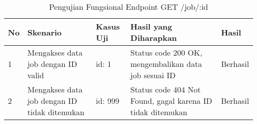 \begin{table}[H]
    \centering
    \begin{tabular}{|p{0.5cm}|p{3cm}|p{5cm}|p{5cm}|p{1.5cm}|}
        \hline
        \rowcolor[HTML]{DAE8FC} 
        \textbf{No} & \textbf{Skenario} & \textbf{Kasus Uji} & \textbf{Hasil yang Diharapkan} & \textbf{Hasil} \\ \hline
        1 & Mengakses data job dengan ID valid & 
        id: 1 & 
        Status code 200 OK, mengembalikan data job sesuai ID & 
        Berhasil \\ \hline
        2 & Mengakses data job dengan ID tidak ditemukan & 
        id: 999 & 
        Status code 404 Not Found, gagal karena ID tidak ditemukan & 
        Berhasil \\ \hline
    \end{tabular}
    \caption{Pengujian Fungsional Endpoint GET /job/:id}
    \label{tab:job_getone_testing}
\end{table}
